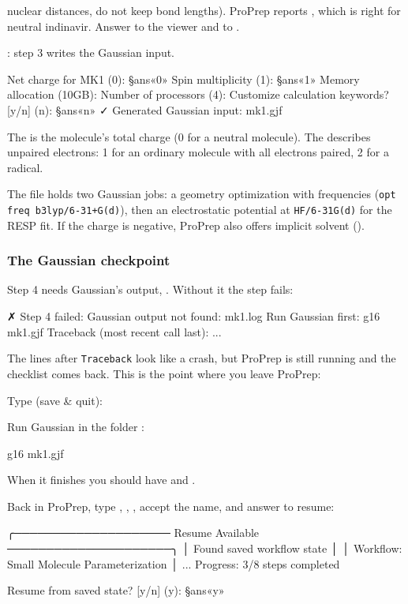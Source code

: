 \begin{steps}
        nuclear distances, do not keep bond lengths). ProPrep reports
        , which is right for neutral
        indinavir. Answer  to the viewer and  to
        .
  \item {}: step 3 writes the Gaussian input.
\begin{screen}
Net charge for MK1 (0): §ans«0»
Spin multiplicity (1): §ans«1»
Memory allocation (10GB):
Number of processors (4):
Customize calculation keywords? [y/n] (n): §ans«n»
✓ Generated Gaussian input: mk1.gjf
\end{screen}
        The  is the molecule's total charge (0 for a neutral
        molecule). The  describes unpaired electrons:
        1 for an ordinary molecule with all electrons paired, 2 for a
        radical.
\end{steps}

The file  holds two Gaussian jobs: a geometry optimization with
frequencies (\texttt{opt freq b3lyp/6-31+G(d)}), then an electrostatic
potential at \texttt{HF/6-31G(d)} for the RESP fit. If the charge is negative,
ProPrep also offers implicit solvent ().

\subsubsection*{The Gaussian checkpoint}

Step 4 needs Gaussian's output, . Without it the step fails:

\begin{screen}
✗ Step 4 failed: Gaussian output not found: mk1.log
Run Gaussian first: g16 mk1.gjf
Traceback (most recent call last):
...
\end{screen}

The lines after \texttt{Traceback} look like a crash, but ProPrep is still
running and the checklist comes back. This is the point where you leave
ProPrep:

\begin{steps}
  \item Type  (save \& quit): 
  \item Run Gaussian in the folder :
\begin{terminal}
g16 mk1.gjf
\end{terminal}
        When it finishes you should have  and .
  \item Back in ProPrep, type , , , accept the name,
        and answer  to resume:
\begin{screen}
╭──────────────────── Resume Available ─────────────────────╮
│ Found saved workflow state                                │
│ Workflow: Small Molecule Parameterization                 │
...
  Progress: 3/8 steps completed

Resume from saved state? [y/n] (y): §ans«y»
\end{screen}
\end{steps}

